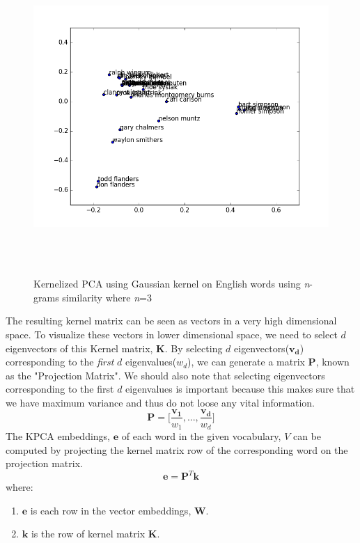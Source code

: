   \begin{figure}[H]
  	\centering
  	\includegraphics[width=15cm,height=12cm,keepaspectratio]{files/KERNELPCA/gaussianN3en.png}
  	\caption{Kernelized PCA using Gaussian kernel on English words using \textit{n}-grams similarity where \textit{n}=3}
  	\label{fig:kgaussianen}
  \end{figure}
   The resulting kernel matrix can be seen as vectors in a very high dimensional space. To visualize these vectors in lower dimensional space, we need to select $d$ eigenvectors of this Kernel matrix, $\mathbf{K}$. By selecting $d$ eigenvectors($\mathbf{v_d}$) corresponding to the \textit{first} $d$ eigenvalues($w_d$), we can generate a matrix $\mathbf{P}$, known as the "Projection Matrix". We should also note that selecting eigenvectors corresponding to the first $d$ eigenvalues is important because this makes sure that we have maximum variance and thus do not loose any vital information.
   \begin{equation}
   \mathbf{P} = \big[\frac{\mathbf{v_1}}{w_1},...,\frac{\mathbf{v_d}}{w_d}\big]
   \end{equation}
   The KPCA embeddings, $\mathbf{e}$ of each word in the given vocabulary, $V$ can be computed by projecting the kernel matrix row of the corresponding word on the projection matrix.
   \begin{equation}
    \mathbf{e}= \mathbf{P}^T \mathbf{k}
   \end{equation}
   where: 
   \begin{enumerate}
   	\item $\mathbf{e}$ is each row in the vector embeddings, $\mathbf{W}$.
   	\item $\mathbf{k}$ is the row of kernel matrix $\mathbf{K}$.
   \end{enumerate}
   

